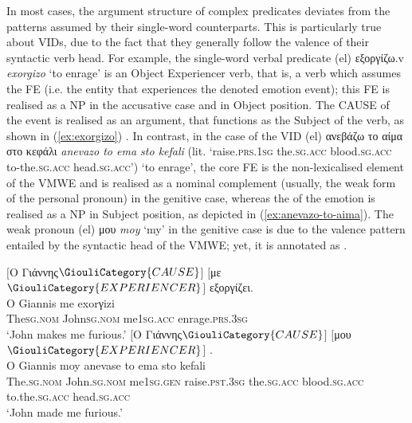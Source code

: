 \documentclass[output=paper,colorlinks,citecolor=brown]{langscibook}
\begin{document}
In most cases, the argument structure of complex predicates deviates from the patterns assumed by their single-word counterparts. This is particularly true about VIDs, due to the fact that they generally follow the valence of their syntactic verb head. For example, the single-word verbal predicate (el) {εξοργίζω}.v \textit{exorgizo} ‘to enrage' is an Object Experiencer verb, that is, a verb which assumes the FE  (i.e. the entity that experiences the denoted emotion event); this FE is realised as a NP in the accusative case and in Object position. The CAUSE of the event is realised as an argument, that functions as the Subject of the verb, as shown in (\ref{ex:exorgizo}) \citep{giouli_2020}. In contrast, in the case of the VID (el) {{ανεβάζω}} {{το}} {{αίμα}} {{στο}} {{κεφάλι}} \textit{anevazo to ema sto kefali} (lit. ‘raise.\textsc{prs.1sg} the.\textsc{sg.acc} blood.\textsc{sg.acc} to-the.\textsc{sg.acc} head.\textsc{sg.acc}') ‘to enrage', the core FE  is the non-lexicalised element of the VMWE and is realised as a nominal complement (usually, the weak form of the personal pronoun) in the genitive case, whereas the  of the emotion is realised as a NP in Subject position, as depicted in (\ref{ex:anevazo-to-aima}). The weak pronoun (el) {μου} \textit{moy} ‘my' in the genitive case is due to the valence pattern entailed by the syntactic head of the VMWE; yet, it is annotated as .

\ea
\label{ex:exorgizo}
\glll
$[$Ο Γιάννης$\GiouliCategory{CAUSE}$$]$ $[$με$\GiouliCategory{EXPERIENCER}$$]$ εξοργίζει. \\
O     Giannis       		     me 	exorγizi \\
The\textsc{sg.nom}   John\textsc{sg.nom}  	me\textsc{1sg.acc} enrage.\textsc{prs.3sg} \\
\glt ‘John makes me furious.’
\ex
\label{ex:anevazo-to-aima}
\glll
$[$Ο Γιάννης$\GiouliCategory{CAUSE}$$]$ $[$μου$\GiouliCategory{EXPERIENCER}$$]$     . \\
O Giannis moy anevase to ema sto kefali \\
The.\textsc{sg.nom}  John.\textsc{sg.nom} 	me\textsc{1sg.gen} raise.\textsc{pst.3sg}   	the.\textsc{sg.acc} blood.\textsc{sg.acc} to.the.\textsc{sg.acc} head.\textsc{sg.acc} \\
\glt ‘John made me furious.’
\z
\end{document}
